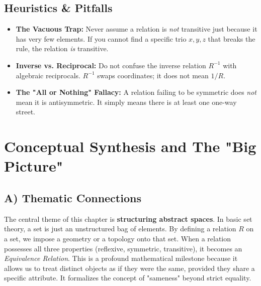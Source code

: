 \documentclass[11pt, a4paper]{article}
\theoremstyle{definition}
\theoremstyle{remark}
\begin{document}
\subsection{Heuristics \& Pitfalls}
\begin{itemize}
    \item \textbf{The Vacuous Trap:} Never assume a relation is \textit{not} transitive just because it has very few elements. If you cannot find a specific trio $x, y, z$ that breaks the rule, the relation \textit{is} transitive.
    \item \textbf{Inverse vs. Reciprocal:} Do not confuse the inverse relation $R^{-1}$ with algebraic reciprocals. $R^{-1}$ swaps coordinates; it does not mean $1/R$.
    \item \textbf{The "All or Nothing" Fallacy:} A relation failing to be symmetric does \textit{not} mean it is antisymmetric. It simply means there is at least one one-way street.
\end{itemize}

\newpage

\section{Conceptual Synthesis and The "Big Picture"}

\subsection{A) Thematic Connections}
The central theme of this chapter is \textbf{structuring abstract spaces}. In basic set theory, a set is just an unstructured bag of elements. By defining a relation $R$ on a set, we impose a geometry or a topology onto that set. 
When a relation possesses all three properties (reflexive, symmetric, transitive), it becomes an \textit{Equivalence Relation}. This is a profound mathematical milestone because it allows us to treat distinct objects as if they were the same, provided they share a specific attribute. It formalizes the concept of "sameness" beyond strict equality.
\end{document}
